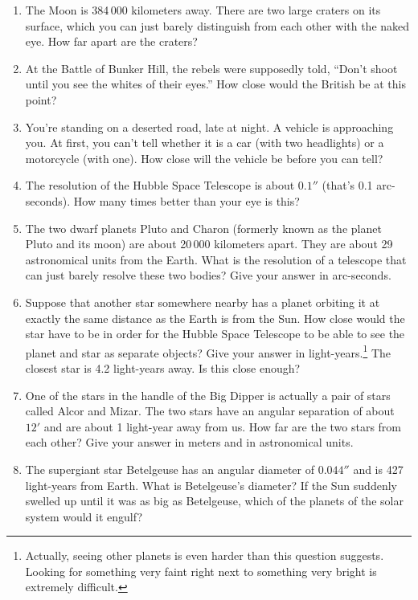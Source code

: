 \begin{enumerate}

\item The Moon is 384\,000 kilometers away. There are two large
craters on its surface, which you can just barely distinguish from
each other with the naked eye. How far apart are the craters?

\item At the Battle of Bunker Hill, the rebels were supposedly
told, ``Don't shoot until you see the whites of their eyes.''
How close would the British be at this point?

\item You're standing on a deserted road, late at night. A vehicle
is approaching you. At first, you can't tell whether it is a car (with
two headlights) or a motorcycle (with one). How close will the vehicle
be before you can tell? 

\item The resolution of the Hubble Space Telescope is about $0.1''$ (that's
0.1 arc-seconds). How many times better than your eye is this?

\item The two dwarf planets Pluto and Charon (formerly known as the planet
Pluto and its moon) are about 20\,000 kilometers
apart. They are about 29 astronomical units from the Earth. What is
the resolution of a telescope that can just barely resolve these two
bodies? Give your answer in arc-seconds.

\item Suppose that another star somewhere nearby has a planet
orbiting it at exactly the same distance as the Earth is from the Sun.
How close would the star have to be in order for the Hubble
Space Telescope to be able to see the planet and star as separate
objects? Give your answer in light-years.\footnote{Actually,
seeing other planets is even harder than this question suggests.
Looking for something very faint right next to something
very bright is extremely difficult.}
The closest star is 4.2 light-years
away. Is this close enough?

\item One of the stars in the handle of the Big Dipper is actually
a pair of stars called Alcor and Mizar. The two stars have
an angular separation of about $12'$ and are about 1 light-year
away from us. How far are the two stars from each other?
Give your answer in meters and in astronomical units.

\item The supergiant star Betelgeuse has an angular diameter of $0.044''$
 and is 427 light-years from Earth. What is Betelgeuse's
diameter? If the Sun suddenly swelled up until it was as big as Betelgeuse,
which of the planets of the solar system would it engulf?



\end{enumerate}
